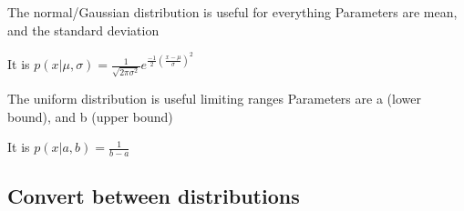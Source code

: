 \documentclass[letterpaper,10pt,english]{sphinxmanual}
\begin{document}

\begin{fulllineitems}
\label{code_distributions:distributions.normal}
The normal/Gaussian distribution is useful for everything
Parameters are mean, and the standard deviation

It is \(p(x\vert\mu ,\sigma) = \frac{ 1}{\sqrt{2\pi\sigma^2}}e^{\frac{-1}{2}\left(\frac{x-\mu}{\sigma}\right)^2}\)

\end{fulllineitems}


\begin{fulllineitems}
\label{code_distributions:distributions.uniform}
The uniform distribution is useful limiting ranges
Parameters are a (lower bound), and b (upper bound)

It is \(p(x\vert a , b) = \frac{1}{b-a}\)

\end{fulllineitems}



\subsection{Convert between distributions}
\label{code_distributions:convert-between-distributions}
\end{document}
